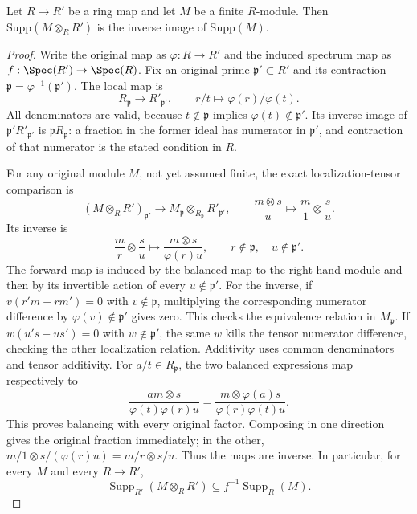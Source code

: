 \begin{lemma}
\label{editorial-source-lemma-support-base-change}
Let $R \to R'$ be a ring map and let $M$ be a finite $R$-module.
Then $\text{Supp}(M \otimes_R R')$ is the inverse image of
$\text{Supp}(M)$.
\end{lemma}

\begin{proof}
Write the original map as $\varphi:R\to R'$ and the induced
spectrum map as $f:\Spec(R')\to\Spec(R)$.
Fix an original prime $\mathfrak p'\subset R'$ and its
contraction $\mathfrak p=\varphi^{-1}(\mathfrak p')$.
The local map is
$$
R_{\mathfrak p}\longrightarrow R'_{\mathfrak p'},
\qquad r/t\longmapsto\varphi(r)/\varphi(t).
$$
All denominators are valid, because $t\notin\mathfrak p$
implies $\varphi(t)\notin\mathfrak p'$. Its inverse image
of $\mathfrak p'R'_{\mathfrak p'}$ is
$\mathfrak pR_{\mathfrak p}$: a fraction in the former
ideal has numerator in $\mathfrak p'$, and contraction
of that numerator is the stated condition in $R$.

For any original module $M$, not yet assumed finite, the
exact localization-tensor comparison is
$$
(M\otimes_RR')_{\mathfrak p'}
\longrightarrow M_{\mathfrak p}\otimes_{R_{\mathfrak p}}R'_{\mathfrak p'},
\qquad \frac{m\otimes s}{u}\longmapsto\frac m1\otimes\frac su.
$$
Its inverse is
$$
\frac mr\otimes\frac su
\longmapsto\frac{m\otimes s}{\varphi(r)u},
\qquad r\notin\mathfrak p,\quad u\notin\mathfrak p'.
$$
The forward map is induced by the balanced map to the
right-hand module and then by its invertible action of
every $u\notin\mathfrak p'$. For the inverse, if
$v(r'm-rm')=0$ with $v\notin\mathfrak p$, multiplying
the corresponding numerator difference by
$\varphi(v)\notin\mathfrak p'$ gives zero. This checks
the equivalence relation in $M_{\mathfrak p}$. If
$w(u's-us')=0$ with $w\notin\mathfrak p'$, the same
$w$ kills the tensor numerator difference, checking the
other localization relation. Additivity uses common
denominators and tensor additivity. For $a/t\in R_{\mathfrak p}$,
the two balanced expressions map respectively to
$$
\frac{am\otimes s}{\varphi(t)\varphi(r)u}
=\frac{m\otimes\varphi(a)s}{\varphi(r)\varphi(t)u}.
$$
This proves balancing with every original factor. Composing
in one direction gives the original fraction immediately;
in the other, $m/1\otimes s/(\varphi(r)u)=m/r\otimes s/u$.
Thus the maps are inverse. In particular, for every $M$
and every $R\to R'$,
$$
\operatorname{Supp}_{R'}(M\otimes_RR')
\subseteq f^{-1}\operatorname{Supp}_R(M).
$$


\end{proof}
